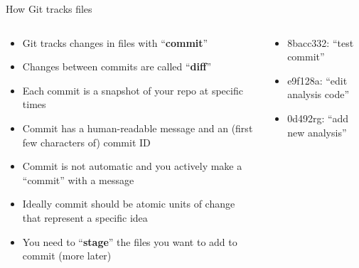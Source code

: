 \documentclass[handout,pdftex,10pt,aspectratio=169]{beamer}
\begin{document}
\begin{frame}{How Git tracks files}
  \begin{columns}[c]
    \begin{column}{0.46\linewidth}
      \begin{itemize}[<+->] \setlength\itemsep{10pt}
        \item Git tracks changes in files with ``\textbf{commit}''
        \item Changes between commits are called ``\textbf{diff}''
        \item Each commit is a snapshot of your repo at specific times
        \item Commit has a human-readable message and an (first few characters of) commit ID
        \item Commit is not automatic and you actively make a ``commit'' with a message
        \item Ideally commit should be atomic units of change that represent a specific idea
        \item You need to ``\textbf{stage}'' the files you want to add to commit (more later)
      \end{itemize}
    \end{column} \hfill
    \begin{column}{0.53\linewidth}
      \centering
      \begin{itemize}
        \item<4-> 8bacc332: ``test commit''
        \item<4-> e9f128a: ``edit analysis code''
        \item<4-> 0d492rg: ``add new analysis''
      \end{itemize}
    \end{column}
  \end{columns}    
\end{frame}
\end{document}
